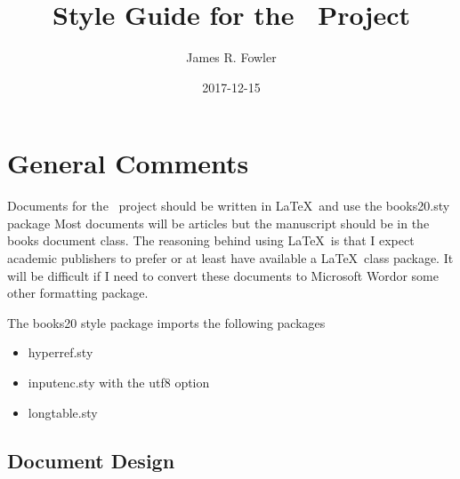 \documentclass{article}
\begin{document}
\title{Style Guide for the \PTitle\ Project}
\author{James R. Fowler}
\date{2017-12-15}

\maketitle

\section{General Comments}

Documents for the \PTitle\ project should be written in \LaTeX\ and use
the books20.sty package Most documents will be articles but the
manuscript should be in the books document class. The reasoning behind
using \LaTeX\ is that I expect academic publishers to prefer or at
least have available a \LaTeX\ class package.  It will be difficult if
I need to convert these documents to Microsoft Word\texttrademark or
some other formatting package.

The books20 style package imports the following packages

\begin{itemize}
\item hyperref.sty
\item inputenc.sty with the utf8 option
\item longtable.sty
\end{itemize}


\subsection{Document Design}
\end{document}
